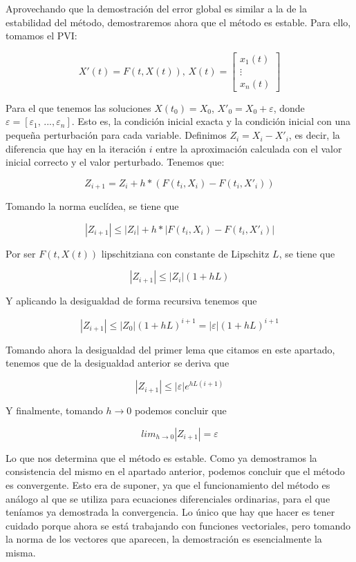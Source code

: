 \documentclass[12pt]{article}       %
\begin{document}
Aprovechando que la demostración del error global es similar a la de la estabilidad del método, demostraremos ahora que el método es estable. Para ello, tomamos el PVI:

$$
X'(t)=F(t,X(t)), \, 
X(t)=\begin{bmatrix}
    x_1(t) \\
    \vdots \\
    x_n(t)
    \end{bmatrix}
$$

Para el que tenemos las soluciones $X(t_0) = X_0$, $X'_0 = X_0 + \varepsilon$, donde $\varepsilon = [\varepsilon_1, \, ..., \varepsilon_n]$. Esto es, la condición inicial exacta y la condición inicial con una pequeña perturbación para cada variable. Definimos $Z_i = X_i - X'_i$, es decir, la diferencia que hay en la iteración $i$ entre la aproximación calculada con el valor inicial correcto y el valor perturbado. Tenemos que:

$$Z_{i+1} = Z_i + h*(F(t_i, X_i) - F(t_i, X'_i)) $$

Tomando la norma euclídea, se tiene que   

$$|Z_{i+1}| \leq |Z_i| + h*|F(t_i, X_i) - F(t_i, X'_i)| $$

Por ser $F(t, X(t))$ lipschitziana con constante de Lipschitz $L$, se tiene que 

$$|Z_{i+1}| \leq |Z_i|(1 + hL)$$

Y aplicando la desigualdad de forma recursiva tenemos que 

$$|Z_{i+1}| \leq |Z_0|(1 + hL)^{i+1} = |\varepsilon|(1 + hL)^{i+1} $$

Tomando ahora la desigualdad del primer lema que citamos en este apartado, tenemos que de la desigualdad anterior se deriva que 

$$|Z_{i+1}| \leq |\varepsilon|e^{hL(i+1)} $$

Y finalmente, tomando $h \rightarrow 0$ podemos concluir que 

$$ lim_{h \rightarrow 0} |Z_{i+1}| = \varepsilon $$

Lo que nos determina que el método es estable. Como ya demostramos la consistencia del mismo en el apartado anterior, podemos concluir que el método es convergente. Esto era de suponer, ya que el funcionamiento del método es análogo al que se utiliza para ecuaciones diferenciales ordinarias, para el que teníamos ya demostrada la convergencia. Lo único que hay que hacer es tener cuidado porque ahora se está trabajando con funciones vectoriales, pero tomando la norma de los vectores que aparecen, la demostración es esencialmente la misma.\\
\end{document}

